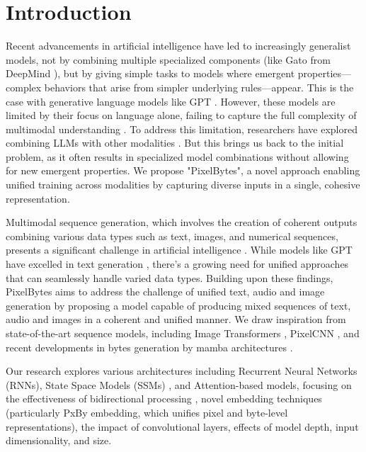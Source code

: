 \documentclass[10pt,a4paper]{article}
\begin{document}
\section{Introduction}

Recent advancements in artificial intelligence have led to increasingly generalist models, not by combining multiple specialized components (like Gato from DeepMind \cite{reed2022generalist}), but by giving simple tasks to models where emergent properties—complex behaviors that arise from simpler underlying rules—appear. This is the case with generative language models like GPT \cite{brown2020language}. However, these models are limited by their focus on language alone, failing to capture the full complexity of multimodal understanding \cite{huang2023language}. To address this limitation, researchers have explored combining LLMs with other modalities \cite{liu2024visual}. But this brings us back to the initial problem, as it often results in specialized model combinations without allowing for new emergent properties. We propose "PixelBytes", a novel approach enabling unified training across modalities by capturing diverse inputs in a single, cohesive representation.

Multimodal sequence generation, which involves the creation of coherent outputs combining various data types such as text, images, and numerical sequences, presents a significant challenge in artificial intelligence \cite{baltruvsaitis2018multimodal}. While models like GPT have excelled in text generation \cite{brown2020language}, there's a growing need for unified approaches that can seamlessly handle varied data types. Building upon these findings, PixelBytes aims to address the challenge of unified text, audio and image generation by proposing a model capable of producing mixed sequences of text, audio and images in a coherent and unified manner. We draw inspiration from state-of-the-art sequence models, including Image Transformers \cite{parmar2018image}, PixelCNN \cite{van2016conditional}, and recent developments in bytes generation by mamba architectures \cite{wang2024mambabyte}.

Our research explores various architectures including Recurrent Neural Networks (RNNs), State Space Models (SSMs) \cite{dao2024transformers}, and Attention-based models, focusing on the effectiveness of bidirectional processing \cite{zhu2024vision}, novel embedding techniques (particularly PxBy embedding, which unifies pixel and byte-level representations), the impact of convolutional layers, effects of model depth, input dimensionality, and size. 
\end{document}
